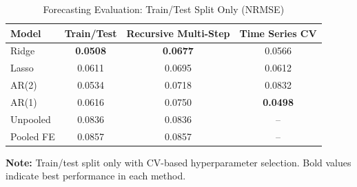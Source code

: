 \begin{table}[htbp]
\centering
\caption{Forecasting Evaluation: Train/Test Split Only (NRMSE)}
\label{tab:forecasting_train_test_simple}
\begin{tabular}{@{} l ccc @{}}
\toprule
\textbf{Model} & \textbf{Train/Test} & \textbf{Recursive Multi-Step} & \textbf{Time Series CV} \\
\midrule
Ridge & \textbf{0.0508} & \textbf{0.0677} & 0.0566 \\
Lasso & 0.0611 & 0.0695 & 0.0612 \\
AR(2) & 0.0534 & 0.0718 & 0.0832 \\
AR(1) & 0.0616 & 0.0750 & \textbf{0.0498} \\
Unpooled & 0.0836 & 0.0836 & -- \\
Pooled FE & 0.0857 & 0.0857 & -- \\
\bottomrule
\end{tabular}
\end{table}

\vspace{0.5cm}
\noindent \textbf{Note:} Train/test split only with CV-based hyperparameter selection. Bold values indicate best performance in each method.